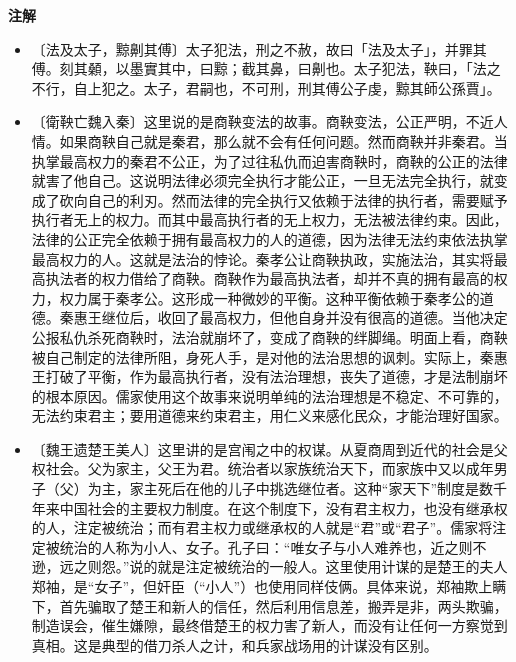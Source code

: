 \documentclass[12pt,UTF-8,openany,a4]{ctexbook}
\begin{document}
\newpage

\begin{Large}
    \noindent\textbf{注解}
\end{Large}


\vspace{-1em}

\begin{itemize}
    \setlength\itemsep{-0.2em}
    \item〔法及太子，黥劓其傅〕{\yiwen 太子犯法，刑之不赦，故曰「法及太子」，并罪其傅。刻其顙，以墨實其中，曰黥；截其鼻，曰劓也。太子犯法，鞅曰，「法之不行，自上犯之。太子，君嗣也，不可刑，刑其傅公子虔，黥其師公孫賈」。}
    \item〔衛鞅亡魏入秦〕{\yiwen 这里说的是商鞅变法的故事。商鞅变法，公正严明，不近人情。如果商鞅自己就是秦君，那么就不会有任何问题。然而商鞅并非秦君。当执掌最高权力的秦君不公正，为了过往私仇而迫害商鞅时，商鞅的公正的法律就害了他自己。这说明法律必须完全执行才能公正，一旦无法完全执行，就变成了砍向自己的利刃。然而法律的完全执行又依赖于法律的执行者，需要赋予执行者无上的权力。而其中最高执行者的无上权力，无法被法律约束。因此，法律的公正完全依赖于拥有最高权力的人的道德，因为法律无法约束依法执掌最高权力的人。这就是法治的悖论。秦孝公让商鞅执政，实施法治，其实将最高执法者的权力借给了商鞅。商鞅作为最高执法者，却并不真的拥有最高的权力，权力属于秦孝公。这形成一种微妙的平衡。这种平衡依赖于秦孝公的道德。秦惠王继位后，收回了最高权力，但他自身并没有很高的道德。当他决定公报私仇杀死商鞅时，法治就崩坏了，变成了商鞅的绊脚绳。明面上看，商鞅被自己制定的法律所阻，身死人手，是对他的法治思想的讽刺。实际上，秦惠王打破了平衡，作为最高执行者，没有法治理想，丧失了道德，才是法制崩坏的根本原因。儒家使用这个故事来说明单纯的法治理想是不稳定、不可靠的，无法约束君主；要用道德来约束君主，用仁义来感化民众，才能治理好国家。}
    \item〔魏王遗楚王美人〕{\yiwen 这里讲的是宫闱之中的权谋。从夏商周到近代的社会是父权社会。父为家主，父王为君。统治者以家族统治天下，而家族中又以成年男子（父）为主，家主死后在他的儿子中挑选继位者。这种“家天下”制度是数千年来中国社会的主要权力制度。在这个制度下，没有君主权力，也没有继承权的人，注定被统治；而有君主权力或继承权的人就是“君”或“君子”。儒家将注定被统治的人称为小人、女子。孔子曰：“唯女子与小人难养也，近之则不逊，远之则怨。”说的就是注定被统治的一般人。这里使用计谋的是楚王的夫人郑袖，是“女子”，但奸臣（“小人”）也使用同样伎俩。具体来说，郑袖欺上瞒下，首先骗取了楚王和新人的信任，然后利用信息差，搬弄是非，两头欺骗，制造误会，催生嫌隙，最终借楚王的权力害了新人，而没有让任何一方察觉到真相。这是典型的借刀杀人之计，和兵家战场用的计谋没有区别。}

\end{itemize}
\end{document}
